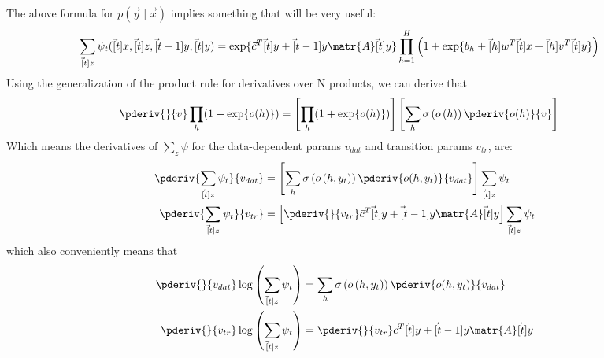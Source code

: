 \documentclass[11pt]{article}
\begin{document}
The above formula for $p(\vec y \mid \vec x)$ implies something that will be very useful:
\begin{align}
\sum_{\vec[t]{z}} \psi_t(\vec[t]{x}, \vec[t]{z}, \vec[t-1]{y}, \vec[t]{y}) 
&= 	\exp\{ \vec{c}^T \vec[t]{y} + \vec[t-1]{y}\matr{A}\vec[t]{y}   \}  
\prod_{h = 1}^{H} \left( 1 + \exp\{ b_h + \vec[h]{w}^T \vec[t]{x} + \vec[h]{v}^T \vec[t]{y}  \} \right)
\end{align}
Using the generalization of the product rule for derivatives over N products, we can derive that
\begin{align}
\pderiv{}{v} \prod_h (1 + \exp\{ o(h) \}) &= \left[ \prod_h (1 + \exp\{ o(h) \})\right] \left[ \sum_h \sigma\left(o\left(h\right)\right) \pderiv{o(h)}{v} \right]
\end{align}
Which means the derivatives of $\sum_z \psi$ for the data-dependent params $v_{dat}$ and transition params $v_{tr}$, are:
\begin{align}
\pderiv{\sum_{\vec[t]{z}} \psi_t}{v_{dat}} 
&=  \left[ \sum_h \sigma\left(o\left(h, y_t\right)\right) \pderiv{o(h, y_t)}{v_{dat}} \right]  \sum_{\vec[t]{z}} \psi_t \\
\pderiv{\sum_{\vec[t]{z}} \psi_t}{v_{tr}}
&= \left[ \pderiv{}{v_{tr}}  \vec{c}^T \vec[t]{y} + \vec[t-1]{y}\matr{A}\vec[t]{y} \right] \sum_{\vec[t]{z}} \psi_t 
\end{align}
which also conveniently means that
\begin{align}
\pderiv{}{v_{dat}} \log\left( \sum_{\vec[t]{z}} \psi_t \right) 
&=  \sum_h \sigma\left(o\left(h, y_t\right)\right) \pderiv{o(h, y_t)}{v_{dat}} \\
\pderiv{}{v_{tr}} \log\left( \sum_{\vec[t]{z}} \psi_t \right) 
&=  \pderiv{}{v_{tr}}  \vec{c}^T \vec[t]{y} + \vec[t-1]{y}\matr{A}\vec[t]{y} 
\end{align}
\end{document}
